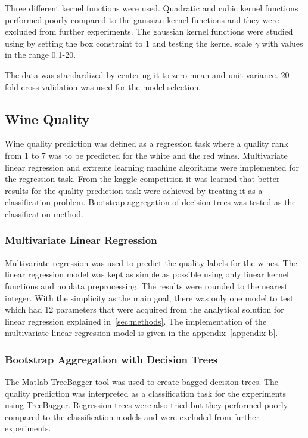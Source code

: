 Three different kernel functions were used. Quadratic and cubic kernel functions performed poorly compared to the gaussian kernel functions and they were excluded from further experiments. The gaussian kernel functions were studied using by setting the box constraint to 1 and testing the kernel scale $\gamma$ with values in the range 0.1-20.

The data was standardized by centering it to zero mean and unit variance. 20-fold cross validation was used for the model selection.

\subsection{Wine Quality}
Wine quality prediction was defined as a regression task where a quality rank from 1 to 7 was to be predicted for the white and the red wines. Multivariate linear regression and extreme learning machine algorithms were implemented for the regression task. From the kaggle competition it was learned that better results for the quality prediction task were achieved by treating it as a classification problem. Bootstrap aggregation of decision trees was tested as the classification method.

\subsubsection{Multivariate Linear Regression}
Multivariate regression was used to predict the quality labels for the wines. The linear regression model was kept as simple as possible using only linear kernel functions and no data preprocessing. The results were rounded to the nearest integer. With the simplicity as the main goal, there was only one model to test which had 12 parameters that were acquired from the analytical solution for linear regression explained in~\ref{sec:methods}. The implementation of the multivariate linear regression model is given in the appendix~\ref{appendix-b}.

\subsubsection{Bootstrap Aggregation with Decision Trees}
The Matlab TreeBagger tool was used to create bagged decision trees. The quality prediction was interpreted as a classification task for the experiments using TreeBagger. Regression trees were also tried but they performed poorly compared to the classification models and were excluded from further experiments.

